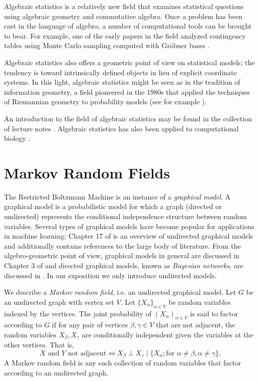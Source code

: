 \documentclass[cclicense]{hmcthesis}
\numberwithin{equation}{chapter}
\numberwithin{thmcounter}{chapter}
\begin{document}
    Algebraic statistics is a relatively new field that examines statistical
    questions using algebraic geometry and commutative algebra.  Once a problem
    has been cast in the language of algebra, a number of computational tools
    can be brought to bear.  For example, one of the early papers in the field
    analyzed contingency tables using Monte Carlo sampling computed with Gröbner
    bases \citep{DS98}.

    Algebraic statistics also offers a geometric point of view on statistical
    models; the tendency is toward intrinsically defined objects in lieu of
    explicit coordinate systems.  In this light, algebraic statistics might be
    seen as in the tradition of information geometry, a field pioneered in the
    1980s that applied the techniques of Riemannian geometry to probability
    models (see for example \citep{Ama}).

    An introduction to the field of algebraic statistics may be found in the
    collection of lecture notes \citep{DSS08}.  Algebraic statistics has also
    been applied to computational biology \citep{ASCB}.


\section{Markov Random Fields}
    \label{sec:rbm-def}

    The Restricted Boltzmann Machine is an instance of a \emph{graphical model}.
    A graphical model is a probabilistic model for which a graph (directed or
    undirected) represents the conditional independence structure between random
    variables.  Several types of graphical models have become popular for
    applications in machine learning; Chapter 17 of \citep{EOSL} is an overview
    of undirected graphical models and additionally contains references to the
    large body of literature.  From the algebro-geometric point of view,
    graphical models in general are discussed in Chapter 3 of \citep{DSS08} and
    directed graphical models, known as \emph{Bayesian networks}, are discussed
    in \citep{GSS}.  In our exposition we only introduce undirected models.

    \begin{definition}
        We describe a \emph{Markov random field}, i.e. an undirected graphical
        model.  Let $G$ be an undirected graph with vertex set $V$.  Let
        $\{X_\alpha\}_{\alpha \in V}$ be random variables indexed by the
        vertices.  The joint probability of $(X_\alpha)_{\alpha \in V}$ is said
        to factor according to $G$ if for any pair of vertices $\beta, \gamma
        \in V$ that are not adjacent, the random variables $X_\beta, X_\gamma$
        are conditionally independent given the variables at the other vertices.
        That is,
        \[
            \text{$X$ and $Y$ not adjacent}
            \Longleftrightarrow
            X_\beta \perp X_\gamma \mid 
            \{X_\alpha; \text{for } \alpha \ne \beta, \alpha \ne \gamma\}.
        \]
        A Markov random field is any such collection of random variables that
        factor according to an undirected graph.
    \end{definition}
\end{document}

